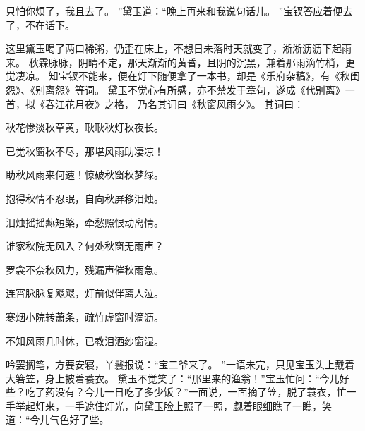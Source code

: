 只怕你烦了，我且去了。
”黛玉道：“晚上再来和我说句话儿。
”宝钗答应着便去了，不在话下。
\par
这里黛玉喝了两口稀粥，仍歪在床上，不想日未落时天就变了，淅淅沥沥下起雨来。
秋霖脉脉，阴晴不定，那天渐渐的黄昏，且阴的沉黑，兼着那雨滴竹梢，更觉凄凉。
知宝钗不能来，便在灯下随便拿了一本书，却是《乐府杂稿》，有《秋闺怨》、《别离怨》等词。
黛玉不觉心有所感，亦不禁发于章句，遂成《代别离》一首，拟《春江花月夜》之格，
乃名其词曰《秋窗风雨夕》。
其词曰：\par
\hop
秋花惨淡秋草黄，耿耿秋灯秋夜长。
\par
已觉秋窗秋不尽，那堪风雨助凄凉！\par
助秋风雨来何速！惊破秋窗秋梦绿。
\par
抱得秋情不忍眠，自向秋屏移泪烛。
\par
泪烛摇摇爇短檠，牵愁照恨动离情。
\par
谁家秋院无风入？何处秋窗无雨声？\par
罗衾不奈秋风力，残漏声催秋雨急。
\par
连宵脉脉复飕飕，灯前似伴离人泣。
\par
寒烟小院转萧条，疏竹虚窗时滴沥。
\par
不知风雨几时休，已教泪洒纱窗湿。
\par
\hop
吟罢搁笔，方要安寝，丫鬟报说：“宝二爷来了。
”一语未完，只见宝玉头上戴着大箬笠，身上披着蓑衣。
黛玉不觉笑了：“那里来的渔翁！”宝玉忙问：“今儿好些？吃了药没有？今儿一日吃了多少饭？”一面说，一面摘了笠，脱了蓑衣，忙一手举起灯来，一手遮住灯光，向黛玉脸上照了一照，觑着眼细瞧了一瞧，笑道：“今儿气色好了些。
